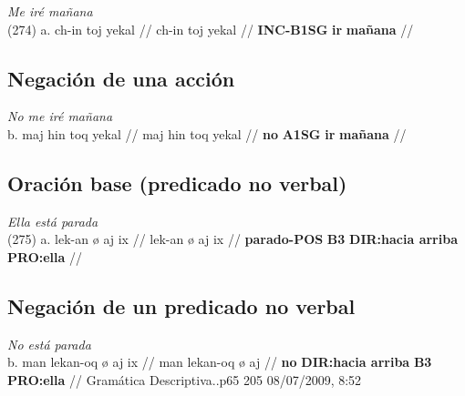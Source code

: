 \documentclass{article}%
\begin{document}
%
\par\medskip%
\ex
\textit{Me iré mañana} \\
\begingl
\gla (274) a. ch-in toj yekal //
\glb ch-in toj yekal //
\glc \textbf{INC-B1SG} \textbf{ir} \textbf{mañana} //
\endgl
\xe
%
\medskip%
\subsection{Negación de una acción}%
\label{subsec:Negacindeunaaccin}%

%
\par\medskip%
\ex
\textit{No me iré mañana} \\
\begingl
\gla b. maj hin toq yekal //
\glb maj hin toq yekal //
\glc \textbf{no} \textbf{A1SG} \textbf{ir} \textbf{mañana} //
\endgl
\xe
%
\medskip%
\subsection{Oración base (predicado no verbal)}%
\label{subsec:Oracinbase(predicadonoverbal)}%

%
\par\medskip%
\ex
\textit{Ella está parada} \\
\begingl
\gla (275) a. lek-an ø aj ix //
\glb lek-an ø aj ix //
\glc \textbf{parado-POS} \textbf{B3} \textbf{DIR:hacia arriba} \textbf{PRO:ella} //
\endgl
\xe
%
\medskip%
\subsection{Negación de un predicado no verbal}%
\label{subsec:Negacindeunpredicadonoverbal}%

%
\par\medskip%
\ex
\textit{No está parada} \\
\begingl
\gla b. man lekan-oq ø aj ix //
\glb man lekan-oq ø aj //
\glc \textbf{no} \textbf{DIR:hacia arriba} \textbf{B3} \textbf{PRO:ella} //
\endgl
\xe
%
\medskip%
Gramática Descriptiva..p65 %
205 %
08/07/2009, 8:52 

%
\end{document}

